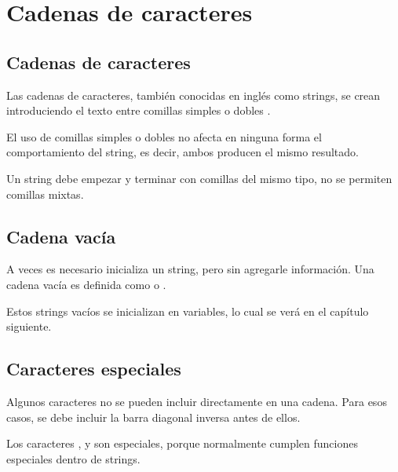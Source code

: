 \chapter{Cadenas de caracteres}

\section{Cadenas de caracteres}

Las cadenas de caracteres, también conocidas en inglés como strings, se crean introduciendo el texto entre comillas simples \ttt{\q \q} o dobles \ttt{\qq \qq}.


El uso de comillas simples o dobles no afecta en ninguna forma el comportamiento del string, es decir, ambos producen el mismo resultado.
\medskip

Un string debe empezar y terminar con comillas del mismo tipo, no se permiten comillas mixtas.



\section{Cadena vacía}

A veces es necesario inicializa un string, pero sin agregarle información.
Una cadena vacía es definida como \ttt{\q \q} o \ttt{\qq \qq}.


Estos strings vacíos se inicializan en variables, lo cual se verá en el capítulo siguiente.

\section{Caracteres especiales}

Algunos caracteres no se pueden incluir directamente en una cadena.
Para esos casos, se debe incluir la barra diagonal inversa \ttt{\textbackslash} antes de ellos.


Los caracteres \ttt{\q}, \ttt{\qq} y \ttt{\textbackslash} son especiales, porque normalmente cumplen funciones especiales dentro de strings.
\medskip

